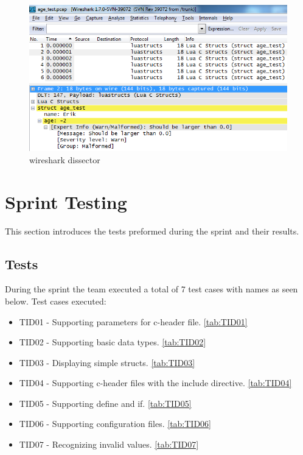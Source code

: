 \begin{figure}[htb]
	\center
	\includegraphics[width=\textwidth]{./sprints/img/wireshark_outofrange}
	\caption{\Gls{wireshark} \gls{dissector}\label{fig:sp1rangerule}}
\end{figure}

\section{Sprint Testing}
\label{sec:sp1:test}
This section introduces the tests preformed during the sprint and their
results.

\subsection{Tests}
During the sprint the team executed a total of 7 test cases with names as seen
below. Test cases executed:
\begin{itemize}
	\item TID01 - Supporting parameters for \Gls{c}-\gls{header} file. \autoref{tab:TID01}
	\item TID02 - Supporting basic data types. \autoref{tab:TID02}
	\item TID03 - Displaying simple \glspl{struct}. \autoref{tab:TID03}
	\item TID04 - Supporting \Gls{c}-\gls{header} files with the \gls{include} directive. \autoref{tab:TID04}
	\item TID05 - Supporting \gls{define} and \gls{if}. \autoref{tab:TID05}
	\item TID06 - Supporting configuration files. \autoref{tab:TID06}
	\item TID07 - Recognizing invalid values. \autoref{tab:TID07}
\end{itemize}

